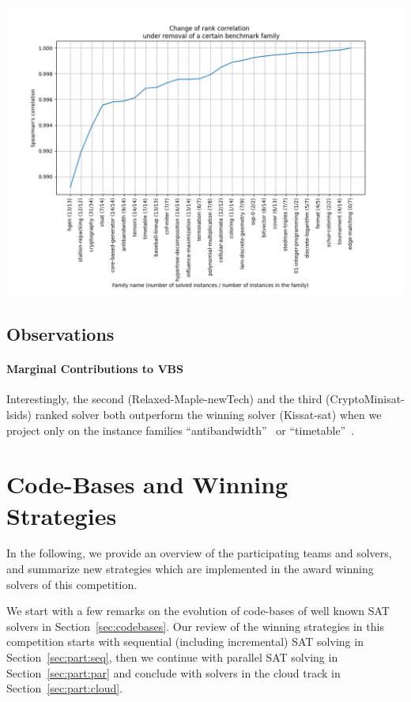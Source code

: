 \documentclass{elsarticle}
\begin{document}
\includegraphics[width=\textwidth]{stability/fam_leave_one_out_corr.png}



\subsection{Observations}

\paragraph{Marginal Contributions to VBS} Interestingly, the second (Relaxed-Maple-newTech) and the third (CryptoMinisat-lsids) ranked solver both outperform the winning solver (Kissat-sat) when we project only on the instance families ``antibandwidth''~\cite{} or ``timetable''~\cite{}. 


\section{Code-Bases and Winning Strategies}
\label{sec:analysis}

In the following, we provide an overview of the participating teams and solvers, 
and summarize new strategies which are implemented in the award winning solvers of this competition. 

We start with a few remarks on the evolution of code-bases of well known SAT solvers in Section~\ref{sec:codebases}. 
Our review of the winning strategies in this competition starts with sequential (including incremental) SAT solving in Section~\ref{sec:part:seq}, then we continue with parallel SAT solving in Section~\ref{sec:part:par} and conclude with solvers in the cloud track in Section~\ref{sec:part:cloud}. 
\end{document}
